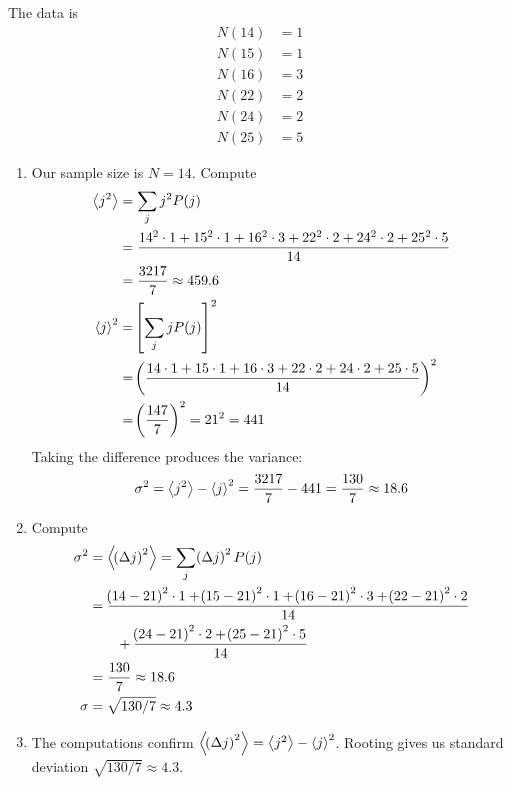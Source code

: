 \documentclass[a4paper]{article}
\begin{document}
The data is
\begin{align*}
	N \!\left( 14 \right) & = 1 \\
	N \!\left( 15 \right) & = 1 \\ 
	N \!\left( 16 \right) & = 3 \\
	N \!\left( 22 \right) & = 2 \\
	N \!\left( 24 \right) & = 2 \\
	N \!\left( 25 \right) & = 5
\end{align*}
\begin{enumerate}[label=(\alph*)]
	\item Our sample size is \( N = 14 \). Compute
	\begin{align*}
		\braket{j^{2}} & = \sum_{j}j^{2}P \!\left( j \right) \\
			       & = \frac{14^{2} \cdot 1 + 15^{2} \cdot 1 + 16^{2} \cdot 3 + 22^{2} \cdot 2 + 24^{2} \cdot 2 + 25^{2} \cdot 5}{14} \\
			       & = \frac{3217}{7} \approx 459.6 \\
		\braket{j}^{2} & = \!\left[ \sum_{j}j P \!\left( j \right) \right]^{2} \\
			       & = \!\left( \frac{14 \cdot 1 + 15 \cdot 1 + 16 \cdot 3 + 22 \cdot 2 + 24 \cdot 2 + 25 \cdot 5}{14} \right)^{2} \\
			       & = \!\left( \frac{147}{7} \right)^{2} = 21^{2} = 441
	\end{align*}
	Taking the difference produces the variance:
	\[
		\sigma^{2} = \braket{j^{2}} - \braket{j}^{2} = \frac{3217}{7} - 441 = \frac{130}{7} \approx18.6
	\]
	\item Compute
	\begin{align*}
		\sigma^{2} & = \braket{\!\left( \Delta j \right)^{2}} = \sum_{j}\!\left( \Delta j \right)^{2}P \!\left( j \right) \\
			   & = \frac{\!\left( 14 - 21 \right)^{2} \cdot 1 + \!\left( 15 - 21 \right)^{2} \cdot 1 + \!\left( 16 - 21 \right)^{2} \cdot 3 + \!\left( 22 - 21 \right)^{2} \cdot 2}{14} \\
			   & \qquad + \frac{\!\left( 24 - 21 \right)^{2} \cdot 2 + \!\left( 25 - 21 \right)^{2} \cdot 5}{14} \\ 
		 & = \frac{130}{7} \approx 18.6 \\
		\sigma & = \sqrt{130 / 7} \approx 4.3
	\end{align*}
	\item The computations confirm \( \braket{\!\left( \Delta j \right)^{2}} = \braket{j^{2}} - \braket{j}^{2} \). Rooting gives us standard deviation \( \sqrt{130 / 7} \approx 4.3 \).
\end{enumerate}
\end{document}
